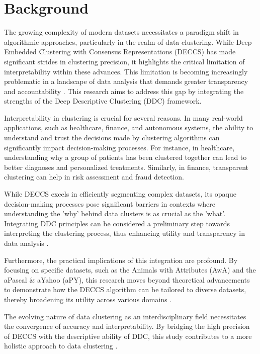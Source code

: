 \section{Background}

The growing complexity of modern datasets necessitates a paradigm shift in algorithmic approaches, particularly in the realm of data clustering. While Deep Embedded Clustering with Consensus Representations (DECCS) has made significant strides in clustering precision, it highlights the critical limitation of interpretability within these advances. This limitation is becoming increasingly problematic in a landscape of data analysis that demands greater transparency and accountability \citep{Balachandran2009}. This research aims to address this gap by integrating the strengths of the Deep Descriptive Clustering (DDC) framework.

Interpretability in clustering is crucial for several reasons. In many real-world applications, such as healthcare, finance, and autonomous systems, the ability to understand and trust the decisions made by clustering algorithms can significantly impact decision-making processes. For instance, in healthcare, understanding why a group of patients has been clustered together can lead to better diagnoses and personalized treatments. Similarly, in finance, transparent clustering can help in risk assessment and fraud detection.

While DECCS excels in efficiently segmenting complex datasets, its opaque decision-making processes pose significant barriers in contexts where understanding the 'why' behind data clusters is as crucial as the 'what'. Integrating DDC principles can be considered a preliminary step towards interpreting the clustering process, thus enhancing utility and transparency in data analysis \citep{Saisubramanian2019}.

Furthermore, the practical implications of this integration are profound. By focusing on specific datasets, such as the Animals with Attributes (AwA) and the aPascal \& aYahoo (aPY), this research moves beyond theoretical advancements to demonstrate how the DECCS algorithm can be tailored to diverse datasets, thereby broadening its utility across various domains \citep{Ozyegen2022}.

The evolving nature of data clustering as an interdisciplinary field necessitates the convergence of accuracy and interpretability. By bridging the high precision of DECCS with the descriptive ability of DDC, this study contributes to a more holistic approach to data clustering \citep{Plant2011}.

